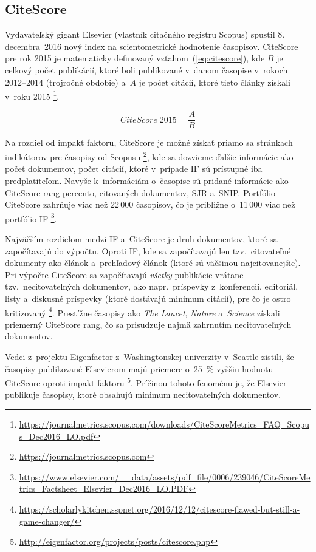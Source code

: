\subsection{CiteScore}
\label{sec:citescore}

Vydavateľský gigant Elsevier (vlastník citačného registru
Scopus) spustil 8.\,decembra~2016 nový index na scientometrické hodnotenie časopisov.  CiteScore
pre rok 2015 je matematicky definovaný vzťahom~(\ref{eq:citescore}), kde $B$ je
celkový počet publikácií, ktoré boli publikované v~danom časopise v~rokoch
2012--2014 (trojročné obdobie) a~$A$ je počet citácií, ktoré tieto články získali
v~roku 2015%
\footnote{\url{https://journalmetrics.scopus.com/downloads/CiteScoreMetrics_FAQ_Scopus_Dec2016_LO.pdf}}.

\begin{equation}
\label{eq:citescore}
CiteScore\; 2015 = \frac{A}{B}
\end{equation}

Na rozdiel od impakt faktoru, CiteScore je možné získať priamo sa stránkach
indikátorov pre časopisy od Scopusu%
\footnote{\url{https://journalmetrics.scopus.com}}, kde sa dozvieme
ďalšie informácie ako počet dokumentov, počet citácií, ktoré v~prípade IF sú
prístupné iba predplatiteľom.  Navyše k~informáciám o~časopise sú pridané
informácie ako CiteScore rang percento, citovaných dokumentov, SJR a~SNIP.
Portfólio CiteScore zahrňuje viac než 22\,000 časopisov, čo je približne
o~11\,000 viac než portfólio IF%
\footnote{\url{https://www.elsevier.com/__data/assets/pdf_file/0006/239046/CiteScoreMetrics_Factsheet_Elsevier_Dec2016_LO.PDF}}.

Najväčším rozdielom medzi IF a~CiteScore je druh dokumentov, ktoré sa
započítavajú do výpočtu.  Oproti IF, kde sa započítavajú len tzv.~citovateľné
dokumenty ako článok a~prehľadový článok (ktoré sú väčšinou najcitovanejšie).
Pri výpočte CiteScore sa započítavajú \emph{všetky} publikácie vrátane
tzv.~necitovateľných dokumentov, ako napr.~príspevky z~konferencií, editoriál,
listy a~diskusné príspevky (ktoré dostávajú minimum citácií), pre čo je ostro
kritizovaný%
\footnote{\url{https://scholarlykitchen.sspnet.org/2016/12/12/citescore-flawed-but-still-a-game-changer/}}.
Prestížne časopisy ako \emph{The Lancet}, \emph{Nature} a~\emph{Science} získali
priemerný CiteScore rang, čo sa prisudzuje najmä zahrnutím necitovateľných
dokumentov.

Vedci z~projektu Eigenfactor z~Washingtonskej univerzity v~Seattle zistili, že
časopisy publikované Elsevierom majú priemere o~25~\% vyššiu hodnotu CiteScore
oproti impakt faktoru%
\footnote{\url{http://eigenfactor.org/projects/posts/citescore.php}}.
Príčinou tohoto fenoménu je, že Elsevier publikuje časopisy, ktoré obsahujú
minimum necitovateľných dokumentov.

